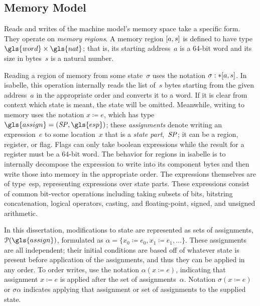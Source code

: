 \subsection{Memory Model}
Reads and writes of the machine model's memory space take a specific form.
They operate on \emph{memory regions}.%
A memory region $[a,s]$ is defined to have type $\gls{word}\times\gls{nat}$;
that is, its starting address~$a$ is a 64-bit word
and its size in bytes~$s$ is a natural number.

Reading a region of memory from some state~$\sigma$
uses the notation $\sigma:\ast[a,s]$.
In \gls{isabelle}, this operation internally reads the list of~$s$ bytes
starting from the given address~$a$ in the appropriate order
and converts it to a word.
If it is clear from context which state is meant, the state will be omitted.
Meanwhile, writing to memory uses the notation $x\coloneqq e$,%
which has type~$\gls{assign}=(\var{SP},\gls{esp})$;
these \emph{assignments} denote writing an expression~$e$ to some location~$x$
that is a \emph{state part},~$\mathit{SP}$;%
%
%
%
%
it can be a region, register, or flag.%
%
%
Flags can only take boolean expressions while
the result for a register must be a 64-bit word.
The behavior for regions in \gls{isabelle} is to internally decompose the expression to write into its component bytes and then write those into memory in the appropriate order.
The expressions themselves are of type~\gls{esp},
representing expressions over state parts.
These expressions consist of common bit-vector
operations including
taking subsets of bits, bitstring concatenation, logical operators, casting,
and floating-point, signed, and unsigned arithmetic.

In this dissertation,
modifications to state are represented as sets of assignments,~$\powerset(\gls{assign})$,
formulated as $\alpha=\{x_0\coloneqq e_0,x_1\coloneqq e_1,\dotsc\}$.
These assignments are all independent; their initial conditions
are based off of whatever state is present before application of the assignments,
and thus they can be applied in any order.
To order writes, use the notation $\alpha(x\coloneqq e)$,
indicating that assignment $x\coloneqq e$ is applied
after the set of assignments~$\alpha$.
Notation $\sigma(x\coloneqq e)$ or $\sigma\alpha$ indicates applying that assignment
or set of assignments to the supplied state.

